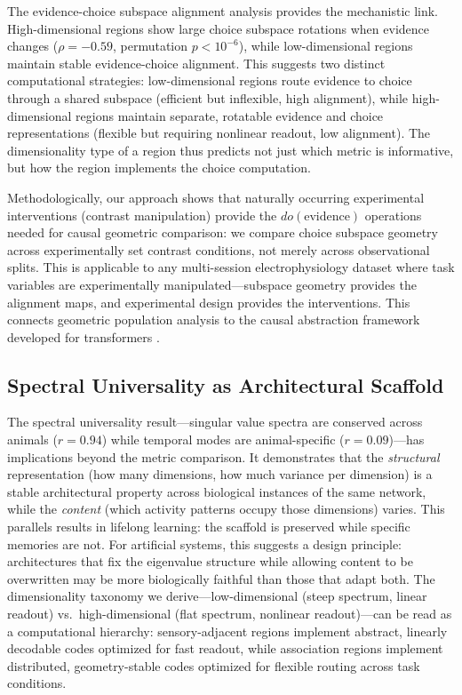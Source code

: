 \documentclass{article}
\begin{document}
The evidence-choice subspace alignment analysis provides the mechanistic link. High-dimensional regions show large choice subspace rotations when evidence changes ($\rho = -0.59$, permutation $p < 10^{-6}$), while low-dimensional regions maintain stable evidence-choice alignment. This suggests two distinct computational strategies: low-dimensional regions route evidence to choice through a shared subspace (efficient but inflexible, high alignment), while high-dimensional regions maintain separate, rotatable evidence and choice representations (flexible but requiring nonlinear readout, low alignment). The dimensionality type of a region thus predicts not just which metric is informative, but how the region implements the choice computation.

Methodologically, our approach shows that naturally occurring experimental interventions (contrast manipulation) provide the $do(\text{evidence})$ operations needed for causal geometric comparison: we compare choice subspace geometry across experimentally set contrast conditions, not merely across observational splits. This is applicable to any multi-session electrophysiology dataset where task variables are experimentally manipulated---subspace geometry provides the alignment maps, and experimental design provides the interventions. This connects geometric population analysis to the causal abstraction framework developed for transformers \citep{geiger2024causal}.

\subsection{Spectral Universality as Architectural Scaffold}

The spectral universality result---singular value spectra are conserved across animals ($r = 0.94$) while temporal modes are animal-specific ($r = 0.09$)---has implications beyond the metric comparison. It demonstrates that the \emph{structural} representation (how many dimensions, how much variance per dimension) is a stable architectural property across biological instances of the same network, while the \emph{content} (which activity patterns occupy those dimensions) varies. This parallels results in lifelong learning: the scaffold is preserved while specific memories are not. For artificial systems, this suggests a design principle: architectures that fix the eigenvalue structure while allowing content to be overwritten may be more biologically faithful than those that adapt both. The dimensionality taxonomy we derive---low-dimensional (steep spectrum, linear readout) vs.\ high-dimensional (flat spectrum, nonlinear readout)---can be read as a computational hierarchy: sensory-adjacent regions implement abstract, linearly decodable codes optimized for fast readout, while association regions implement distributed, geometry-stable codes optimized for flexible routing across task conditions.
\end{document}

